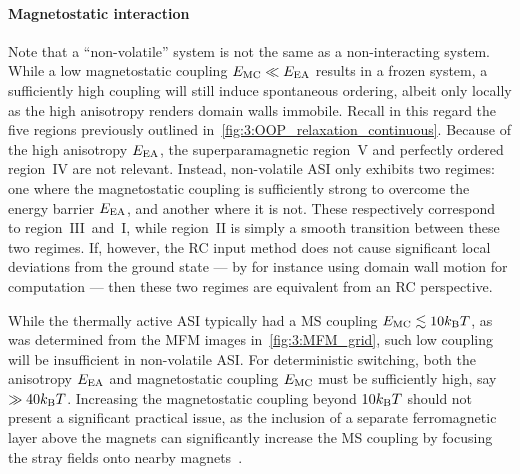 \paragraph{Magnetostatic interaction}
Note that a ``non-volatile'' system is not the same as a non-interacting system.
While a low magnetostatic coupling $E_\mathrm{MC} \ll E_\mathrm{EA}$ results in a frozen system, a sufficiently high coupling will still induce spontaneous ordering, albeit only locally as the high anisotropy renders domain walls immobile.
Recall in this regard the five regions previously outlined in~\cref{fig:3:OOP_relaxation_continuous}.
Because of the high anisotropy $E_\mathrm{EA}$, the superparamagnetic region~$\mathrm{V}$ and perfectly ordered region~$\mathrm{IV}$ are not relevant.
Instead, non-volatile ASI only exhibits two regimes: one where the magnetostatic coupling is sufficiently strong to overcome the energy barrier $E_\mathrm{EA}$, and another where it is not.
These respectively correspond to region~$\mathrm{III}$~and~$\mathrm{I}$, while region~$\mathrm{II}$ is simply a smooth transition between these two regimes.
If, however, the RC input method does not cause significant local deviations from the ground state --- by for instance using domain wall motion for computation --- then these two regimes are equivalent from an RC perspective. \par


While the thermally active ASI typically had a MS coupling $\EMC \lesssim 10\kBT$, as was determined from the MFM images in~\cref{fig:3:MFM_grid}, such low coupling will be insufficient in non-volatile ASI.
For deterministic switching, both the anisotropy $E_\mathrm{EA}$ and magnetostatic coupling $E_\mathrm{MC}$ must be sufficiently high, say $\gg 40 \kBT$.
Increasing the magnetostatic coupling beyond $10\kBT$ should not present a significant practical issue, as the inclusion of a separate ferromagnetic layer above the magnets can significantly increase the MS coupling by focusing the stray fields onto nearby magnets~\cite[Supp. 10]{KUR-24}.

